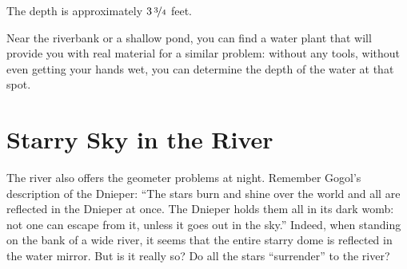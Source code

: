 The depth is approximately $3\,\nicefrac{3}{4}$ feet.

Near the riverbank or a shallow pond, you can find a water plant that will provide you with real material for a similar problem: without any tools, without even getting your hands wet, you can determine the depth of the water at that spot.



\section{Starry Sky in the River}
\label{sec-2.16}

The river also offers the geometer problems at night. Remember Gogol's description of the Dnieper: ``The stars burn and shine over the world and all are reflected in the Dnieper at once. The Dnieper holds them all in its dark womb: not one can escape from it, unless it goes out in the sky.'' Indeed, when standing on the bank of a wide river, it seems that the entire starry dome is reflected in the water mirror. But is it really so? Do all the stars ``surrender'' to the river?


